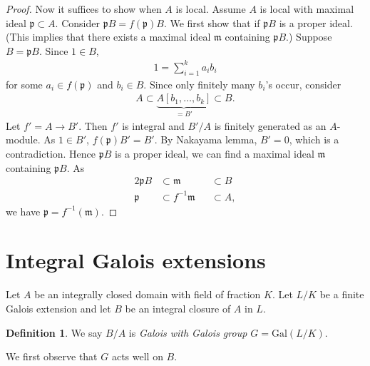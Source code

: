 \documentclass[12pt]{report}
\theoremstyle{plain}
\theoremstyle{remark}
\theoremstyle{definition}
\newtheorem{definition}[theorem]{Definition}
\begin{document}
\begin{proof}
     \noindent Now it suffices to show when $A$ is local. Assume $A$ is local with maximal ideal $\mathfrak{p}\subset A$. Consider $\mathfrak{p}B=f(\mathfrak{p})B$. We first show that if $\mathfrak{p}B$ is a proper ideal. (This implies that there exists a maximal ideal $\mathfrak{m}$ containing $\mathfrak{p}B$.) Suppose $B=\mathfrak{p}B$. Since $1\in B$,
     \begin{align*}
         1=\sum_{i=1}^k a_ib_i
     \end{align*}
     for some $a_i\in f(\mathfrak{p})$ and $b_i\in B$. Since only finitely many $b_i$'s occur, consider
     \begin{align*}
         A \subset\underbrace{A[b_1,\dots,b_k]}_{=B'}\subset B.
     \end{align*}
     Let $f'=A\to B'$. Then $f'$ is integral and $B'/A$ is finitely generated as an $A$-module. As $1\in B'$, $f(\mathfrak{p})B'=B'$. By Nakayama lemma, $B'=0$, which is a contradiction. Hence $\mathfrak{p}B$ is a proper ideal, we can find a maximal ideal $\mathfrak{m}$ containing $\mathfrak{p}B$. As
     \begin{alignat*}{2}
         \mathfrak{p}B &\subset \mathfrak{m} &&\subset B \\
         \mathfrak{p} &\subset f^{-1}\mathfrak{m} &&\subset A, 
     \end{alignat*}
     we have $\mathfrak{p}=f^{-1}(\mathfrak{m})$. 
\end{proof}


\clearpage
\section{Integral Galois extensions}
Let $A$ be an integrally closed domain with field of fraction $K$. Let $L/K$ be a finite Galois extension and let $B$ be an integral closure of $A$ in $L$.

\begin{figure}[H]
    \centering
\end{figure}

\begin{definition}
    We say $B/A$ is \emph{Galois with Galois group $G=\mathrm{Gal}(L/K)$}.
\end{definition}

We first observe that $G$ acts well on $B$.
\end{document}
